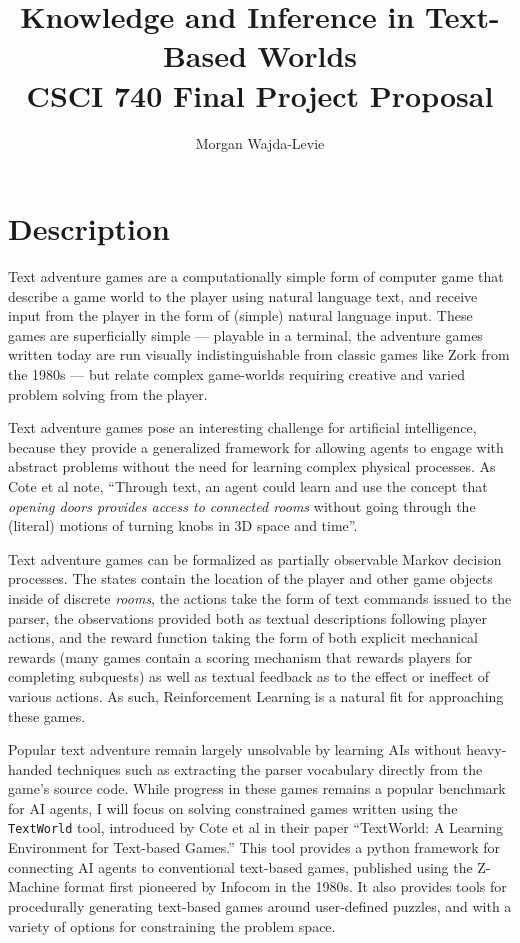 \documentclass{article}
\title{Knowledge and Inference in Text-Based Worlds\\
\Large{CSCI 740 Final Project Proposal}}
\author{Morgan Wajda-Levie}
\begin{document}
\maketitle

\section{Description}

Text adventure games are a computationally simple form of computer game
that describe a game world to the player using natural language text,
and receive input from the player in the form of (simple) natural
language input. These games are superficially simple --- playable in a
terminal, the adventure games written today are run visually
indistinguishable from classic games like Zork from the 1980s --- but
relate complex game-worlds requiring creative and varied problem solving
from the player.

Text adventure games pose an interesting challenge for artificial
intelligence, because they provide a generalized framework for allowing
agents to engage with abstract problems without the need for learning
complex physical processes. As Cote et al note, ``Through text, an agent
could learn and use the concept that \emph{opening doors provides access
to connected rooms} without going through the (literal) motions of
turning knobs in 3D space and time''\cite{cote_textworld_2019}.

Text adventure games can be formalized as partially observable Markov
decision processes. The states contain the location of the player and
other game objects inside of discrete \emph{rooms}, the actions take the
form of text commands issued to the parser, the observations provided
both as textual descriptions following player actions, and the reward
function taking the form of both explicit mechanical rewards (many games
contain a scoring mechanism that rewards players for completing
subquests) as well as textual feedback as to the effect or ineffect of
various actions. As such, Reinforcement Learning is a natural fit for
approaching these games\cite{cote_textworld_2019}.

Popular text adventure remain largely unsolvable by learning AIs without
heavy-handed techniques such as extracting the parser vocabulary
directly from the game's source code\cite{cote_textworld_2019}. While
progress in these games remains a popular benchmark for AI agents, I
will focus on solving constrained games written using the
\texttt{TextWorld} tool, introduced by Cote et al in their paper
``TextWorld: A Learning Environment for Text-based Games.'' This tool
provides a python framework for connecting AI agents to conventional
text-based games, published using the Z-Machine format first pioneered
by Infocom in the 1980s. It also provides tools for procedurally
generating text-based games around user-defined puzzles, and with a
variety of options for constraining the problem
space\cite{cote_textworld_2019}.
\end{document}
